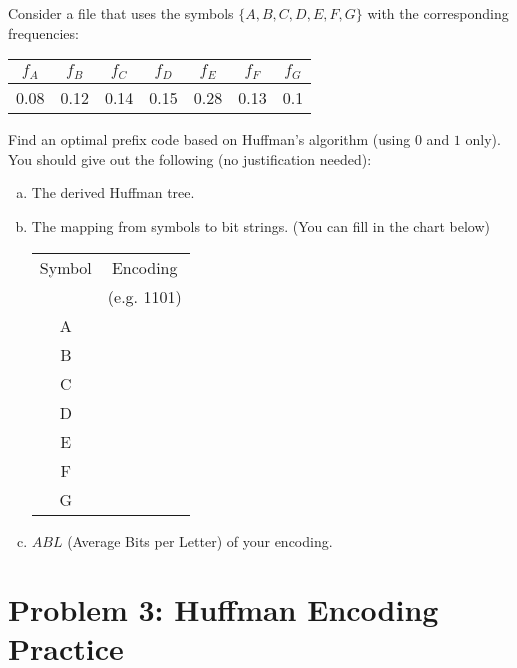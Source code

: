 \documentclass[11pt]{article}
\begin{document}
    
    \begin{tcolorbox}[title={Problem 3 (Huffman Encoding Practice, 15 points)}] \setlength\parindent{1em}
        Consider a file that uses the symbols $\{A,B,C,D,E,F,G\}$ with the corresponding frequencies:
        
        \begin{center}
            \begin{tabular}{c|c|c|c|c|c|c}
               $f_A$  & $f_B$ & $f_C$ & $f_D$ & $f_E$ & $f_F$ & $f_G$ \\
               \hline
                0.08 & 0.12 & 0.14 & 0.15 & 0.28 & 0.13 & 0.1 \\
            \end{tabular}
        \end{center}

        Find an optimal prefix code based on Huffman’s algorithm (using $0$ and $1$ only). You should give out the following (no justification needed):
        
        \begin{enumerate}[(a)]
        \item The derived Huffman tree.
        \item The mapping from symbols to bit strings. (You can fill in the chart below)
        \begin{center}
            \begin{tabular}{c|c}
               Symbol & Encoding \\ 
               & (e.g. 1101)\\ \hline
                A & \\ \hline
                B & \\ \hline
                C & \\ \hline
                D & \\ \hline
                E & \\ \hline
                F & \\ \hline
                G & \\            
            \end{tabular}
        \end{center}
        \item $ABL$ (Average Bits per Letter) of your encoding.
        \end{enumerate}    
    \end{tcolorbox}
    \section*{Problem 3: Huffman Encoding Practice}
\end{document}
